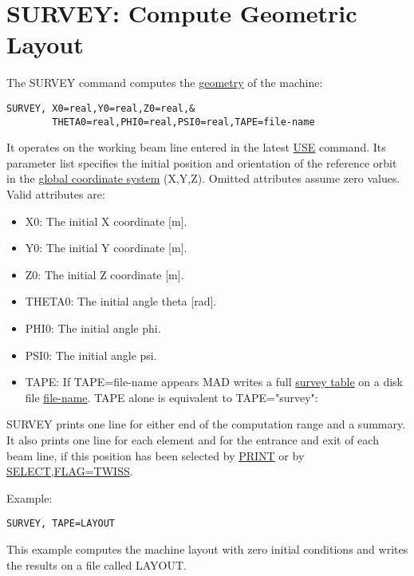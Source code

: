 

\section{SURVEY: Compute Geometric Layout}  
The SURVEY command computes the \href{global.html}{geometry} of the machine: 
\begin{verbatim}
SURVEY, X0=real,Y0=real,Z0=real,&
        THETA0=real,PHI0=real,PSI0=real,TAPE=file-name
\end{verbatim} 

It operates on the working beam line entered in the latest
\href{use.html}{USE} command. Its parameter list specifies the initial
position and orientation of the reference orbit in the
\href{global.html}{global coordinate system} (X,Y,Z). Omitted attributes
assume zero values. Valid attributes are:  
\begin{itemize}
   \item X0: The initial X coordinate [m]. 
   \item Y0: The initial Y coordinate [m]. 
   \item Z0: The initial Z coordinate [m]. 
   \item THETA0: The initial angle theta [rad]. 
   \item PHI0: The initial angle phi. 
   \item PSI0: The initial angle psi. 
   \item TAPE: If TAPE=file-name appears MAD writes a full
     \href{tape3.html#survey}{survey table} on a disk file
     \href{files.html}{file-name}. TAPE alone is equivalent to
     TAPE="survey":  
\end{itemize} 

SURVEY prints one line for either end of the computation range and a
summary. It also prints one line for each element and for the entrance
and exit of each beam line, if this position has been selected by
\href{print.html}{PRINT} or by \href{print.html}{SELECT,FLAG=TWISS}.  

Example: 
\begin{verbatim}
SURVEY, TAPE=LAYOUT
\end{verbatim} 
This example computes the machine layout with zero initial conditions
and writes the results on a file called LAYOUT.

